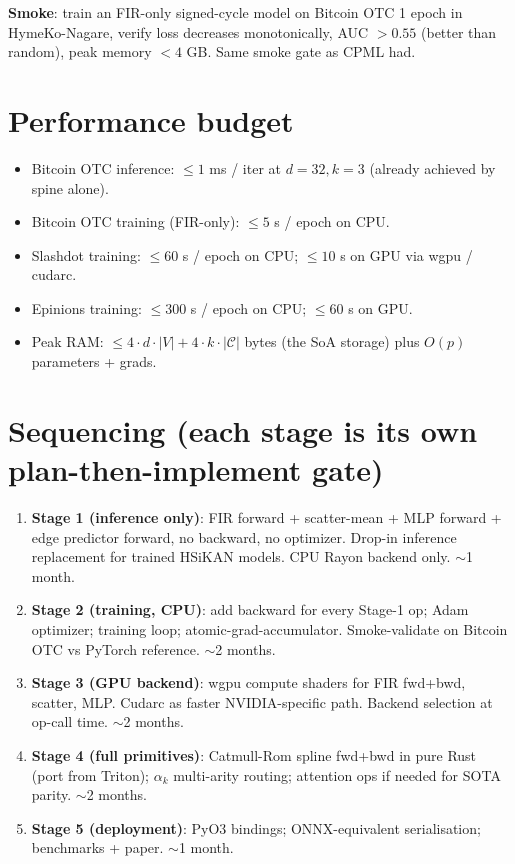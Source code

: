 \documentclass[10pt]{article}
\begin{document}
\textbf{Smoke}: train an FIR-only signed-cycle model on Bitcoin OTC
1 epoch in HymeKo-Nagare, verify loss decreases monotonically, AUC
$> 0.55$ (better than random), peak memory $< 4$ GB. Same smoke gate
as CPML had.

\section*{Performance budget}

\begin{itemize}
  \item Bitcoin OTC inference: $\le 1$ ms / iter at $d=32, k=3$
    (already achieved by spine alone).
  \item Bitcoin OTC training (FIR-only): $\le 5$ s / epoch on CPU.
  \item Slashdot training: $\le 60$ s / epoch on CPU; $\le 10$ s on
    GPU via wgpu / cudarc.
  \item Epinions training: $\le 300$ s / epoch on CPU; $\le 60$ s on
    GPU.
  \item Peak RAM: $\le 4 \cdot d \cdot |V| + 4 \cdot k \cdot |\mathcal{C}|$
    bytes (the SoA storage) plus $O(p)$ parameters + grads.
\end{itemize}

\section*{Sequencing (each stage is its own plan-then-implement gate)}

\begin{enumerate}
  \item \textbf{Stage 1 (inference only)}: FIR forward + scatter-mean +
    MLP forward + edge predictor forward, no backward, no optimizer.
    Drop-in inference replacement for trained HSiKAN models. CPU
    Rayon backend only. $\sim$1 month.
  \item \textbf{Stage 2 (training, CPU)}: add backward for every Stage-1
    op; Adam optimizer; training loop; atomic-grad-accumulator.
    Smoke-validate on Bitcoin OTC vs PyTorch reference. $\sim$2 months.
  \item \textbf{Stage 3 (GPU backend)}: wgpu compute shaders for FIR
    fwd+bwd, scatter, MLP. Cudarc as faster NVIDIA-specific path.
    Backend selection at op-call time. $\sim$2 months.
  \item \textbf{Stage 4 (full primitives)}: Catmull-Rom spline fwd+bwd
    in pure Rust (port from Triton); $\alpha_k$ multi-arity routing;
    attention ops if needed for SOTA parity. $\sim$2 months.
  \item \textbf{Stage 5 (deployment)}: PyO3 bindings; ONNX-equivalent
    serialisation; benchmarks + paper. $\sim$1 month.
\end{enumerate}
\end{document}
